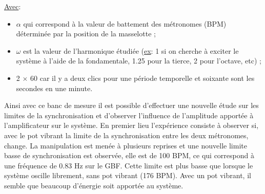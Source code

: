 \documentclass[a4paper,11pt]{report}
\begin{document}
\underline{Avec}:\\
\begin{itemize}[label=\textbullet, leftmargin=* ,parsep=0cm,itemsep=0cm,topsep=0cm,font=\tiny]
\item $\alpha$ qui correspond à la valeur de battement des métronomes (BPM) déterminée par la position de la masselotte ;
\item $\omega$ est la valeur de l'harmonique étudiée (\underline{ex}: 1 si on cherche à exciter le système à l'aide de la fondamentale, 1.25 pour la tierce, 2 pour l'octave, etc) ;
\item 2 $\times$ 60 car il y a deux clics pour une période temporelle et soixante sont les secondes en une minute.\\
\end{itemize}

Ainsi avec ce banc de mesure il est possible d'effectuer une nouvelle étude sur les limites de la synchronisation et d'observer l'influence de l'amplitude apportée à l'amplificateur sur le système. En premier lieu l'expérience consiste à observer si, avec le pot vibrant la limite de la synchronisation entre les deux métronomes, change. La manipulation est menée à plusieurs reprises et une nouvelle limite basse de synchronisation est observée, elle est de 100 BPM, ce qui correspond à une fréquence de 0.83 Hz sur le GBF. Cette limite est plus basse que lorsque le système oscille librement, sans pot vibrant (176 BPM). Avec un pot vibrant, il semble que beaucoup d'énergie soit apportée au système.\\
\end{document}

